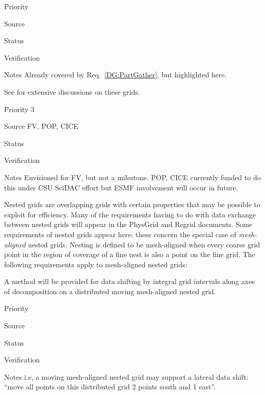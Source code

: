 \begin{reqlist}
\item[Priority]
\item[Source]
\item[Status]
\item[Verification]
\item[Notes] Already covered by Req.~\ref{DG:PartGather}, but
  highlighted here.
\end{reqlist}



See \cite{art:heikes+:geodesic,art:majewski+:gme} for extensive
discussions on these grids.

\begin{reqlist}
\item[Priority] 3
\item[Source] FV, POP, CICE
\item[Status]
\item[Verification]
\item[Notes] Envisioned for FV, but not a milestone.  POP, CICE
             currently funded to do this under CSU SciDAC effort
             but ESMF involvement will occur in future.
\end{reqlist}



Nested grids are overlapping grids with certain properties that may be
possible to exploit for efficiency. Many of the requirements having to
do with data exchange between nested grids will appear in the PhysGrid
and Regrid documents. Some requirements of nested grids appear here:
these concern the special case of \emph{mesh-aligned} nested
grids. Nesting is defined to be mesh-aligned when every coarse grid
point in the region of coverage of a fine nest is also a point on the
fine grid. The following requirements apply to mesh-aligned nested
grids:


A method will be provided for data shifting by integral grid intervals
along axes of decomposition on a distributed moving mesh-aligned
nested grid.

\begin{reqlist}
\item[Priority]
\item[Source]
\item[Status]
\item[Verification]
\item[Notes] i.e, a moving mesh-aligned nested grid may support a
  lateral data shift: ``move all points on this distributed grid 2
  points south and 1 east''.
\end{reqlist}

